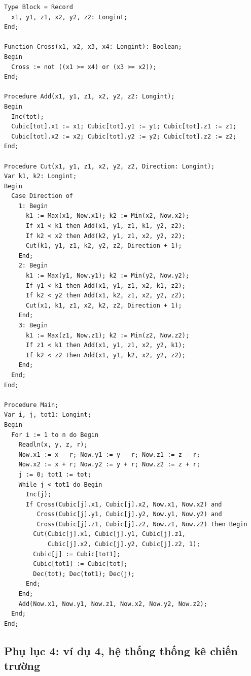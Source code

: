 \documentclass[11pt]{article}
\begin{document}
\begin{verbatim}
Type Block = Record
  x1, y1, z1, x2, y2, z2: Longint;
End;

Function Cross(x1, x2, x3, x4: Longint): Boolean;
Begin
  Cross := not ((x1 >= x4) or (x3 >= x2));
End;

Procedure Add(x1, y1, z1, x2, y2, z2: Longint);
Begin
  Inc(tot);
  Cubic[tot].x1 := x1; Cubic[tot].y1 := y1; Cubic[tot].z1 := z1;
  Cubic[tot].x2 := x2; Cubic[tot].y2 := y2; Cubic[tot].z2 := z2;
End;

Procedure Cut(x1, y1, z1, x2, y2, z2, Direction: Longint);
Var k1, k2: Longint;
Begin
  Case Direction of
    1: Begin
      k1 := Max(x1, Now.x1); k2 := Min(x2, Now.x2);
      If x1 < k1 then Add(x1, y1, z1, k1, y2, z2);
      If k2 < x2 then Add(k2, y1, z1, x2, y2, z2);
      Cut(k1, y1, z1, k2, y2, z2, Direction + 1);
    End;
    2: Begin
      k1 := Max(y1, Now.y1); k2 := Min(y2, Now.y2);
      If y1 < k1 then Add(x1, y1, z1, x2, k1, z2);
      If k2 < y2 then Add(x1, k2, z1, x2, y2, z2);
      Cut(x1, k1, z1, x2, k2, z2, Direction + 1);
    End;
    3: Begin
      k1 := Max(z1, Now.z1); k2 := Min(z2, Now.z2);
      If z1 < k1 then Add(x1, y1, z1, x2, y2, k1);
      If k2 < z2 then Add(x1, y1, k2, x2, y2, z2);
    End;
  End;
End;

Procedure Main;
Var i, j, tot1: Longint;
Begin
  For i := 1 to n do Begin
    Readln(x, y, z, r);
    Now.x1 := x - r; Now.y1 := y - r; Now.z1 := z - r;
    Now.x2 := x + r; Now.y2 := y + r; Now.z2 := z + r;
    j := 0; tot1 := tot;
    While j < tot1 do Begin
      Inc(j);
      If Cross(Cubic[j].x1, Cubic[j].x2, Now.x1, Now.x2) and
         Cross(Cubic[j].y1, Cubic[j].y2, Now.y1, Now.y2) and
         Cross(Cubic[j].z1, Cubic[j].z2, Now.z1, Now.z2) then Begin
        Cut(Cubic[j].x1, Cubic[j].y1, Cubic[j].z1,
            Cubic[j].x2, Cubic[j].y2, Cubic[j].z2, 1);
        Cubic[j] := Cubic[tot1];
        Cubic[tot1] := Cubic[tot];
        Dec(tot); Dec(tot1); Dec(j);
      End;
    End;
    Add(Now.x1, Now.y1, Now.z1, Now.x2, Now.y2, Now.z2);
  End;
End;
\end{verbatim}

\subsection*{Phụ lục 4: ví dụ 4, hệ thống thống kê chiến trường}
\end{document}
